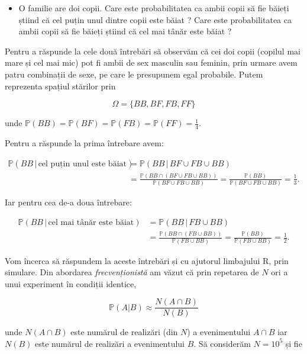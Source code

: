 \documentclass[]{article}
\newenvironment{frshaded*}{%
  \def\FrameCommand{\fboxrule=\FrameRule\fboxsep=\FrameSep \fcolorbox{framecolor}{shadecolor1}}%
  \MakeFramed {\advance\hsize-\width \FrameRestore}}%
{\endMakeFramed}
\newenvironment{rmdblock}[1]
  {\begin{frshaded*}
  \begin{itemize}
  \renewcommand{\labelitemi}{
    \raisebox{-.7\height}[0pt][0pt]{
      {\setkeys{Gin}{width=2em,keepaspectratio}\texttt{[image: images/icons/\#1]}}
    }
  }
  \item
  }
  {
  \end{itemize}
  \end{frshaded*}
  }
\newenvironment{rmdexercise}
  {\begin{rmdblock}{exercise}}
  {\end{rmdblock}}
\begin{document}
\begin{rmdexercise}
O familie are doi copii. Care este probabilitatea ca ambii copii să fie
băieți știind că cel puțin unul dintre copii este băiat ? Care este
probabilitatea ca ambii copii să fie băieți știind că cel mai tânăr este
băiat ?
\end{rmdexercise}

Pentru a răspunde la cele două întrebări să observăm că cei doi copii
(copilul mai mare și cel mai mic) pot fi ambii de sex masculin sau
feminin, prin urmare avem patru combinații de sexe, pe care le
presupunem egal probabile. Putem reprezenta spațiul stărilor prin

\[
\Omega = \{BB,BF,FB,FF\}
\]

unde
\(\mathbb{P}(BB)=\mathbb{P}(BF)=\mathbb{P}(FB)=\mathbb{P}(FF)=\frac{1}{4}\).

Pentru a răspunde la prima întrebare avem:

\[
\begin{aligned}
  \mathbb{P}\left(BB\,|\,\text{cel puțin unul este băiat}\right) &= \mathbb{P}\left(BB\,|\,BF\cup FB\cup BB\right)\\
    &= \frac{\mathbb{P}\left(BB\cap (BF\cup FB\cup BB)\right)}{\mathbb{P}\left(BF\cup FB\cup BB\right)} = \frac{\mathbb{P}\left(BB\right)}{\mathbb{P}\left(BF\cup FB\cup BB\right)} = \frac{1}{3}.
\end{aligned}
\]

Iar pentru cea de-a doua întrebare:

\[
\begin{aligned}
  \mathbb{P}\left(BB\,|\,\text{cel mai tânăr este băiat}\right) &= \mathbb{P}\left(BB\,|\,FB\cup BB\right)\\
    &= \frac{\mathbb{P}\left(BB\cap (FB\cup BB)\right)}{\mathbb{P}\left(FB\cup BB\right)} = \frac{\mathbb{P}\left(BB\right)}{\mathbb{P}\left(FB\cup BB\right)} = \frac{1}{2}.
\end{aligned}
\]

Vom încerca să răspundem la aceste întrebări și cu ajutorul limbajului
R, prin simulare. Din abordarea \emph{frecvenționistă} am văzut că prin
repetarea de \(N\) ori a unui experiment în condiții identice,

\[
  \mathbb{P}(A|B)\approx \frac{N(A\cap B)}{N(B)}
\]

unde \(N(A\cap B)\) este numărul de realizări (din \(N\)) a
evenimentului \(A\cap B\) iar \(N(B)\) este numărul de realizări a
evenimentului \(B\). Să considerăm \(N = 10^5\) și fie
\end{document}
